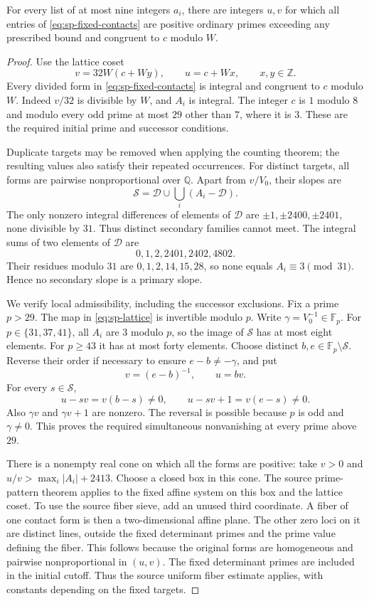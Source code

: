 \begin{lemma}\label{lem:sp-contacts}
For every list of at most nine integers $a_i$, there are integers $u,v$
for which all entries of \eqref{eq:sp-fixed-contacts} are positive
ordinary primes exceeding any prescribed bound and congruent to $c$
modulo $W$.
\end{lemma}
\begin{proof}
Use the lattice coset
\begin{equation}\label{eq:sp-lattice}
 v=32W(c+Wy),\qquad u=c+Wx,\qquad x,y\in\mathbb Z.
\end{equation}
Every divided form in \eqref{eq:sp-fixed-contacts} is integral and
congruent to $c$ modulo $W$. Indeed $v/32$ is divisible by $W$,
and $A_i$ is integral. The integer $c$ is $1$ modulo $8$ and
modulo every odd prime at most $29$ other than $7$, where it is $3$.
These are the required initial prime and successor conditions.

Duplicate targets may be removed when applying the counting theorem;
the resulting values also satisfy their repeated occurrences. For distinct
targets, all forms are pairwise nonproportional over $\mathbb Q$.
Apart from $v/V_0$, their slopes are
\[
 \mathcal S=\mathcal D\cup\bigcup_i(A_i-\mathcal D).
\]
The only nonzero integral differences of elements of $\mathcal D$ are
$\pm1,\pm2400,\pm2401$, none divisible by $31$. Thus distinct
secondary families cannot meet. The integral sums of two elements of
$\mathcal D$ are
\[
 0,1,2,2401,2402,4802.
\]
Their residues modulo $31$ are $0,1,2,14,15,28$, so none equals
$A_i\equiv3\pmod{31}$. Hence no secondary slope is a primary slope.

We verify local admissibility, including the successor exclusions.
Fix a prime $p>29$. The map in \eqref{eq:sp-lattice} is invertible
modulo $p$. Write $\gamma=V_0^{-1}\in\mathbb F_p$. For
$p\in\{31,37,41\}$, all $A_i$ are $3$ modulo $p$, so the
image of $\mathcal S$ has at most eight elements. For $p\ge43$
it has at most forty elements. Choose distinct
$b,e\in\mathbb F_p\setminus\mathcal S$. Reverse their order if
necessary to ensure $e-b\ne-\gamma$, and put
\[
 v=(e-b)^{-1},\qquad u=bv.
\]
For every $s\in\mathcal S$,
\[
 u-sv=v(b-s)\ne0,\qquad u-sv+1=v(e-s)\ne0.
\]
Also $\gamma v$ and $\gamma v+1$ are nonzero. The reversal is
possible because $p$ is odd and $\gamma\ne0$. This proves the
required simultaneous nonvanishing at every prime above $29$.

There is a nonempty real cone on which all the forms are positive:
take $v>0$ and $u/v>\max_i|A_i|+2413$. Choose a closed box in
this cone. The source prime-pattern theorem applies to the fixed affine
system on this box and the lattice coset. To use the source fiber sieve,
add an unused third coordinate. A fiber of one contact form is then a
two-dimensional affine plane. The other zero loci on it are distinct
lines, outside the fixed determinant primes and the prime value defining
the fiber. This follows because the original forms are homogeneous
and pairwise nonproportional in $(u,v)$. The fixed determinant primes
are included in the initial cutoff. Thus the source uniform fiber
estimate applies, with constants depending on the fixed targets.


\end{proof}
